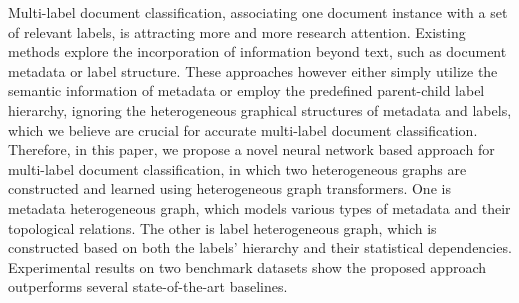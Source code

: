 Multi-label document classification, associating one document instance with a set of relevant labels, is attracting more and more research attention. Existing methods explore the incorporation of information beyond text, such as document metadata or label structure. These approaches however either simply utilize the semantic information of metadata or employ the predefined parent-child label hierarchy, ignoring the heterogeneous graphical structures of metadata and labels, which we believe are crucial for accurate multi-label document classification. Therefore, in this paper, we propose a novel neural network based approach for multi-label document classification, in which two heterogeneous graphs are constructed and learned using heterogeneous graph transformers. One is metadata heterogeneous graph, which models various types of metadata and their topological relations. The other is label heterogeneous graph, which is constructed based on both the labels' hierarchy and their statistical dependencies. Experimental results on two benchmark datasets show the proposed approach outperforms several state-of-the-art baselines.
